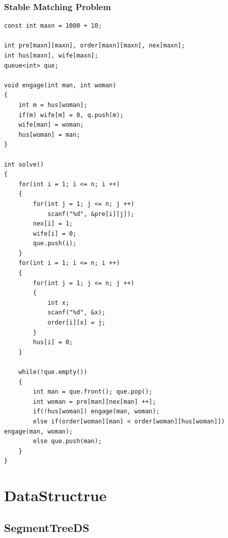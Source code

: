 \documentclass[twoside]{article}
\begin{document}
\subsubsection{Stable Matching Problem}
\begin{lstlisting}
const int maxn = 1000 + 10;

int pre[maxn][maxn], order[maxn][maxn], nex[maxn];
int hus[maxn], wife[maxn];
queue<int> que;

void engage(int man, int woman)
{
	int m = hus[woman];
	if(m) wife[m] = 0, q.push(m);
	wife[man] = woman;
	hus[woman] = man;
}

int solve()
{
	for(int i = 1; i <= n; i ++)
	{
		for(int j = 1; j <= n; j ++)
			scanf("%d", &pre[i][j]);	
		nex[i] = 1;
		wife[i] = 0;
		que.push(i);
	}
	for(int i = 1; i <= n; i ++)
	{
		for(int j = 1; j <= n; j ++)
		{
			int x;
			scanf("%d", &x);
			order[i][x] = j;	
		}
		hus[i] = 0;
	}

	while(!que.empty())
	{
		int man = que.front(); que.pop();
		int woman = pre[man][nex[man] ++];
		if(!hus[woman]) engage(man, woman);
		else if(order[woman][man] < order[woman][hus[woman]]) engage(man, woman);
		else que.push(man);
	}
}\end{lstlisting}
\clearpage\section{DataStructrue}
\subsection{SegmentTreeDS}
\end{document}
